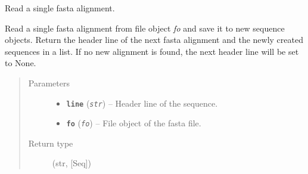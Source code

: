 \documentclass[letterpaper,10pt,english]{sphinxmanual}
\begin{document}
\begin{fulllineitems}
\label{fasta:libPoMo.fasta.read_align_from_fo}
Read a single fasta alignment.

Read a single fasta alignment from file object \emph{fo} and save it to
new {\hyperref[seqbase:libPoMo.seqbase.Seq]{}} sequence objects.  Return
the header line of the next fasta alignment and the newly created
sequences in a list.  If no new alignment is found, the next header
line will be set to None.
\begin{quote}\begin{description}
\item[{Parameters}] \leavevmode\begin{itemize}
\item {} 
\textbf{\texttt{line}} (\emph{\texttt{str}}) -- Header line of the sequence.

\item {} 
\textbf{\texttt{fo}} (\emph{\texttt{fo}}) -- File object of the fasta file.

\end{itemize}

\item[{Return type}] \leavevmode
(str, {[}Seq{]})

\end{description}\end{quote}

\end{fulllineitems}

\end{document}
